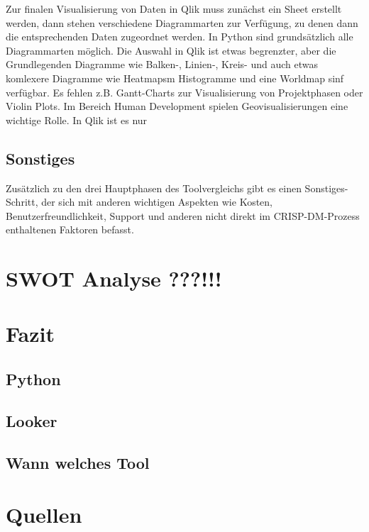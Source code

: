 \documentclass[12pt]{article}
\begin{document}
	Zur finalen Visualisierung von Daten in Qlik muss zunächst ein Sheet erstellt werden, dann stehen verschiedene Diagrammarten zur Verfügung, zu denen dann die entsprechenden Daten zugeordnet werden.
	In Python sind grundsätzlich alle Diagrammarten möglich. Die Auswahl in Qlik ist etwas begrenzter, aber die Grundlegenden Diagramme wie Balken-, Linien-, Kreis- und auch etwas komlexere Diagramme wie Heatmapsm Histogramme und eine Worldmap sinf verfügbar. Es fehlen z.B. Gantt-Charts zur Visualisierung von Projektphasen oder Violin Plots.
	Im Bereich Human Development spielen Geovisualisierungen eine wichtige Rolle. In Qlik ist es nur 
	 
	
	
	
	\subsection{Sonstiges}
	Zusätzlich zu den drei Hauptphasen des Toolvergleichs gibt es einen Sonstiges-Schritt, der sich mit anderen wichtigen Aspekten wie Kosten, Benutzerfreundlichkeit, Support und anderen nicht direkt im CRISP-DM-Prozess enthaltenen Faktoren befasst.
	
	
	
	\section{SWOT Analyse ???!!!}
	
	\section{Fazit}
	
	\subsection{Python}

	\subsection{Looker}

	\subsection{Wann welches Tool}
	
	\section{Quellen}
	
\end{document}

